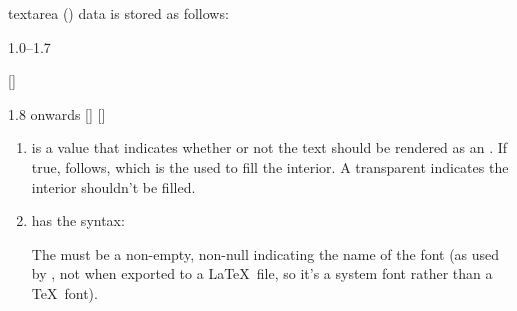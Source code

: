 \begin{numbered}
\begin{enumerate}

  \end{enumerate}%

\item\label{jdr:textarea}%
\Gls{textarea} () data is stored as follows:
\begin{jdrversion}{1.0--1.7}
\begin{syntaxline}
 
 []  
\end{syntaxline}
\end{jdrversion}
\begin{jdrversion}{1.8 onwards}
 []
 
 []  
\end{jdrversion}

  \begin{enumerate}
  \item\label{jdr:outline}  is a 
  value that indicates whether or not the text should be rendered as
  an . If true,  follows, which is the
   used to fill the interior. A transparent 
  indicates the interior shouldn't be filled.

  \item\label{jdr:fontspecs}  has the syntax:
  \begin{syntaxline}
     
  \end{syntaxline}
  The  must be a non-empty, non-null 
  indicating the name of the font (as used by \FlowframTk, not
  when exported to a \LaTeX\ file, so it's a system font rather than a
  \TeX\ font).


\end{enumerate}
\end{numbered}
